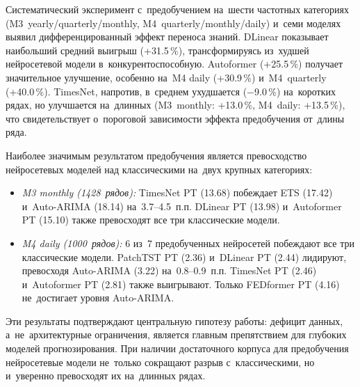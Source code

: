 Систематический эксперимент с~предобучением на~шести частотных категориях
(M3~yearly/quarterly/monthly, M4~quarterly/monthly/daily) и~семи моделях
выявил дифференцированный эффект переноса знаний. DLinear показывает
наибольший средний выигрыш (+31.5\,\%), трансформируясь из~худшей
нейросетевой модели в~конкурентоспособную. Autoformer (+25.5\,\%)
получает значительное улучшение, особенно на~M4 daily (+30.9\,\%)
и~M4~quarterly (+40.0\,\%). TimesNet, напротив, в~среднем ухудшается
($-$9.0\,\%) на~коротких рядах, но улучшается на~длинных
(M3~monthly: +13.0\,\%, M4~daily: +13.5\,\%), что свидетельствует
о~пороговой зависимости эффекта предобучения от~длины ряда.

Наиболее значимым результатом предобучения является превосходство
нейросетевых моделей над классическими на~двух крупных категориях:

\begin{itemize}[nosep]
\item \textit{M3 monthly (1428~рядов):} TimesNet PT (13.68) побеждает
ETS (17.42) и~Auto-ARIMA (18.14) на~3.7--4.5~п.п.
DLinear PT (13.98) и~Autoformer PT (15.10) также превосходят
все три классические модели.

\item \textit{M4 daily (1000~рядов):} 6 из~7 предобученных нейросетей
побеждают все три классические модели. PatchTST PT (2.36) и~DLinear PT (2.44)
лидируют, превосходя Auto-ARIMA (3.22) на~0.8--0.9~п.п.
TimesNet PT (2.46) и~Autoformer PT (2.81) также выигрывают.
Только FEDformer PT (4.16) не~достигает уровня Auto-ARIMA.
\end{itemize}

Эти результаты подтверждают центральную гипотезу работы:
дефицит данных, а~не~архитектурные ограничения, является
главным препятствием для глубоких моделей прогнозирования.
При наличии достаточного корпуса для предобучения нейросетевые модели
не~только сокращают разрыв с~классическими, но и~уверенно превосходят
их на~длинных рядах.

